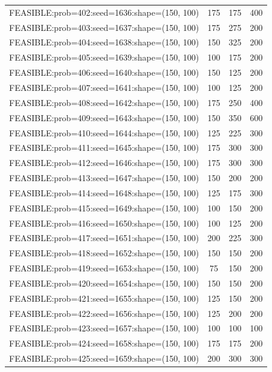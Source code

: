 \begin{longtable}{lccc}
FEASIBLE:prob=402:seed=1636:shape=(150, 100) &  175 &   175 &    400 \\
FEASIBLE:prob=403:seed=1637:shape=(150, 100) &  175 &   275 &    200 \\
FEASIBLE:prob=404:seed=1638:shape=(150, 100) &  150 &   325 &    200 \\
FEASIBLE:prob=405:seed=1639:shape=(150, 100) &  100 &   175 &    200 \\
FEASIBLE:prob=406:seed=1640:shape=(150, 100) &  150 &   125 &    200 \\
FEASIBLE:prob=407:seed=1641:shape=(150, 100) &  100 &   125 &    200 \\
FEASIBLE:prob=408:seed=1642:shape=(150, 100) &  175 &   250 &    400 \\
FEASIBLE:prob=409:seed=1643:shape=(150, 100) &  150 &   350 &    600 \\
FEASIBLE:prob=410:seed=1644:shape=(150, 100) &  125 &   225 &    300 \\
FEASIBLE:prob=411:seed=1645:shape=(150, 100) &  175 &   300 &    300 \\
FEASIBLE:prob=412:seed=1646:shape=(150, 100) &  175 &   300 &    300 \\
FEASIBLE:prob=413:seed=1647:shape=(150, 100) &  150 &   200 &    200 \\
FEASIBLE:prob=414:seed=1648:shape=(150, 100) &  125 &   175 &    300 \\
FEASIBLE:prob=415:seed=1649:shape=(150, 100) &  100 &   150 &    200 \\
FEASIBLE:prob=416:seed=1650:shape=(150, 100) &  100 &   125 &    200 \\
FEASIBLE:prob=417:seed=1651:shape=(150, 100) &  200 &   225 &    300 \\
FEASIBLE:prob=418:seed=1652:shape=(150, 100) &  150 &   150 &    200 \\
FEASIBLE:prob=419:seed=1653:shape=(150, 100) &   75 &   150 &    200 \\
FEASIBLE:prob=420:seed=1654:shape=(150, 100) &  150 &   150 &    200 \\
FEASIBLE:prob=421:seed=1655:shape=(150, 100) &  125 &   150 &    200 \\
FEASIBLE:prob=422:seed=1656:shape=(150, 100) &  125 &   200 &    200 \\
FEASIBLE:prob=423:seed=1657:shape=(150, 100) &  100 &   100 &    100 \\
FEASIBLE:prob=424:seed=1658:shape=(150, 100) &  175 &   175 &    200 \\
FEASIBLE:prob=425:seed=1659:shape=(150, 100) &  200 &   300 &    300 \\

\end{longtable}
